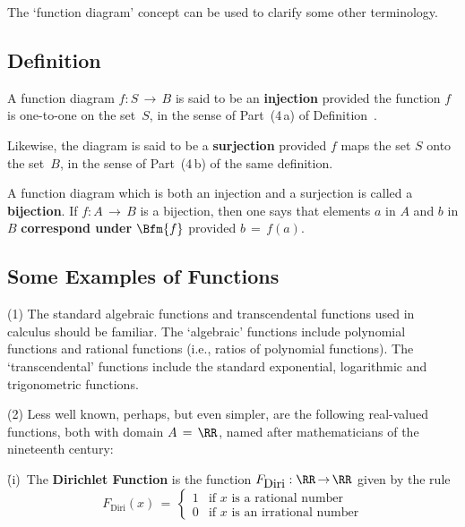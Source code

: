 \VV

        The `function diagram' concept can be used to clarify some other terminology.

            \subsection{\small{\bf Definition}}
            \label{DefA30.20B}
\V


        A function diagram $f:S \,{\rightarrow}\, B$ is said to be an {\bf injection}
    provided the function $f$ is one-to-one on the set~$S$, in the sense of Part~(4\,a) of Definition~.

        Likewise, the diagram is said to be a {\bf surjection}
    provided $f$ maps the set $S$ onto the set~$B$, in the sense of Part~(4\,b) of the same definition.

        A function diagram which is both an injection and a surjection is called a {\bf bijection}.
    If $f:A \,{\rightarrow}\, B$ is a bijection, then one says that elements $a$ in $A$ and $b$ in $B$
    {\bf correspond under $\Bfm{f}$} provided $b \,=\, f(a)$.



        \subsection{\small{\bf Some Examples of Functions}}
        \label{ExampA30.25}

\V

\hspace*{\parindent}(1) The standard algebraic functions and transcendental functions used in calculus should be familiar.
    The `algebraic' functions include polynomial functions and rational functions (i.e., ratios of polynomial functions).
    The `transcendental' functions include the standard exponential, logarithmic and trigonometric functions.

\V

        (2) Less well known, perhaps, but even simpler, are the following real-valued functions, both with domain $A \,=\, {\RR}$,
    named after mathematicians of the nineteenth century:

        \h (i)\, The {\bf Dirichlet Function} is the function $F_{\mbox{Diri}}:{\RR} \,{\rightarrow}\, {\RR}$ given by the rule
        \begin{displaymath}
        F_{\mbox{Diri}}(x) \,=\, \left\{
        \begin{array}{ll}
        1 & \mbox{if $x$ is a rational number} \\
        0 & \mbox{if $x$ is an irrational number}
        \end{array}
            \right.
        \end{displaymath}

